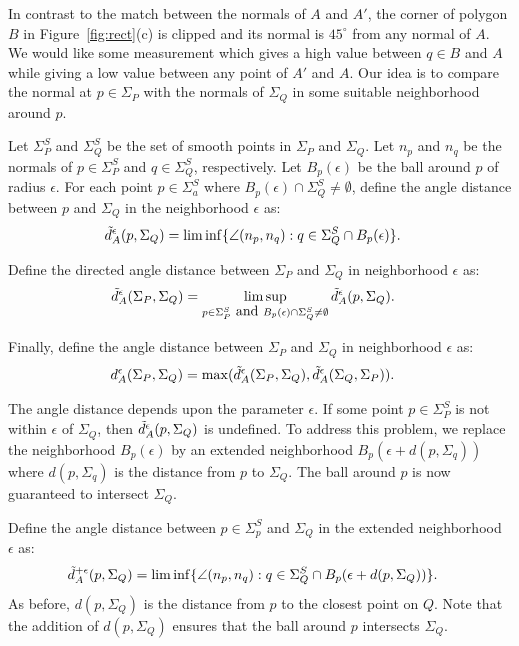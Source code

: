 In contrast to the match between the normals of $A$ and $A'$, 
the corner of polygon $B$ in Figure~\ref{fig:rect}(c)
is clipped and its normal is $45^\circ$ from any normal of $A$.
We would like some measurement which gives a high value 
between $q \in B$ and $A$ while giving a low value between
any point of $A'$ and $A$.
Our idea is to compare the normal at $p \in \Sigma_P$ 
with the normals of $\Sigma_Q$ in some suitable neighborhood 
around $p$.

Let $\Sigma^S_P$ and $\Sigma^S_Q$ be the set of smooth points
in $\Sigma_P$ and $\Sigma_Q$.
Let $n_p$ and $n_q$ be the normals of $p \in \Sigma^S_P$
and $q \in \Sigma^S_Q$, respectively.
Let $B_p(\epsilon)$ be the ball around $p$ of radius $\epsilon$.
For each point $p \in \Sigma^S_a$ 
where $B_p(\epsilon) \cap \Sigma^S_Q \neq \emptyset$,
define the angle distance between $p$ and $\Sigma_Q$
in the neighborhood $\epsilon$ as:
\begin{align*}
\tilde{d}_A^\epsilon(p,\Sigma_Q) & = \liminf\{ \angle(n_p, n_q) : 
q \in \Sigma^S_Q \cap B_p(\epsilon) \}.
\end{align*}

Define the directed angle distance between $\Sigma_P$ and $\Sigma_Q$
in neighborhood $\epsilon$ as:
\begin{align*}
\tilde{d}_A^\epsilon(\Sigma_P,\Sigma_Q) & = 
  \limsup_{p \in \Sigma^S_P \mbox{ and } 
  B_p(\epsilon) \cap \Sigma^S_Q \neq \emptyset} 
         \tilde{d}_A^\epsilon(p,\Sigma_Q).
\end{align*}

Finally, define the angle distance between $\Sigma_P$ and $\Sigma_Q$
in neighborhood $\epsilon$ as:
\begin{align*}
d_A^\epsilon(\Sigma_P,\Sigma_Q) & = 
\max(\tilde{d}_A^\epsilon(\Sigma_P,\Sigma_Q), \tilde{d}_A^\epsilon(\Sigma_Q,\Sigma_P)).
\end{align*}

The angle distance depends upon the parameter $\epsilon$.
If some point $p \in \Sigma^S_P$ is not within $\epsilon$ of $\Sigma_Q$,
then $\tilde{d}_A^\epsilon(p,\Sigma_Q)$ is undefined.
To address this problem, we replace the neighborhood $B_p(\epsilon)$
by an extended neighborhood $B_p(\epsilon+d(p,\Sigma_q))$
where $d(p,\Sigma_q)$ is the distance from $p$ to $\Sigma_Q$.
The ball around $p$ is now guaranteed to intersect $\Sigma_Q$.

Define the angle distance 
between $p \in \Sigma^S_p$ and $\Sigma_Q$ in the extended
neighborhood $\epsilon$ as:
\begin{align*}
\tilde{d}_A^{+\epsilon}(p,\Sigma_Q) & = 
  \liminf\{ \angle(n_p, n_q) : 
     q \in \Sigma^S_Q \cap B_p(\epsilon+d(p,\Sigma_Q)) \}.
\end{align*}
As before, $d(p,\Sigma_Q)$ is the distance from $p$ to the closest point on $Q$.
Note that the addition of $d(p,\Sigma_Q)$ ensures that the ball
around $p$ intersects $\Sigma_Q$.

